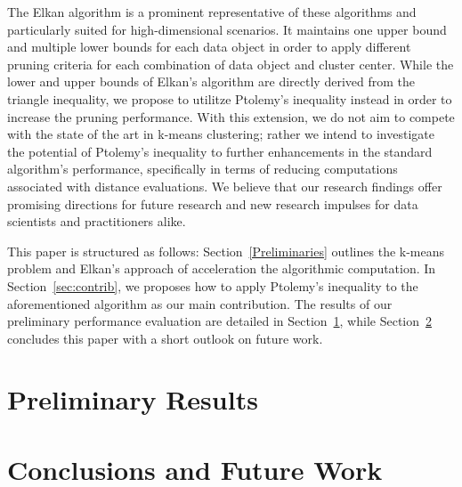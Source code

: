 The Elkan algorithm \cite{DBLP:conf/icml/Elkan03} is a prominent representative of these algorithms and particularly suited for high-dimensional scenarios.
It maintains one upper bound and multiple lower bounds for each data object in order to apply different pruning criteria for each combination of data object and cluster center.
While the lower and upper bounds of Elkan's algorithm are directly derived from the triangle inequality, we propose to utilitze Ptolemy's inequality instead in order to increase the pruning performance.
With this extension, we do not aim to compete with the state of the art in k-means clustering;
rather we intend to investigate the potential of Ptolemy’s inequality to further enhancements in the standard algorithm’s performance, specifically in terms of reducing computations associated with distance evaluations. We believe that our research findings offer promising directions for future research and new research impulses for data scientists and practitioners alike.

This paper is structured as follows:
Section~\ref{Preliminaries} outlines the k-means problem and Elkan's approach of acceleration the algorithmic computation.
In Section~\ref{sec:contrib}, we proposes how to apply Ptolemy's inequality to the aforementioned algorithm as our main contribution.
The results of our preliminary performance evaluation are detailed in Section~\ref{sec: results}, while Section~\ref{sec: conclusions} concludes this paper with a short outlook on future work.













\section{Preliminary Results}\label{sec: results}




\section{Conclusions and Future Work} \label{sec: conclusions}

